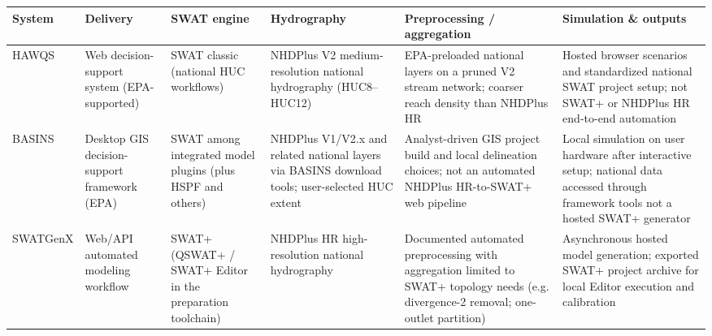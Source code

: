 \begin{tabularx}{\textwidth}{@{} Z Y Y Y Y Y @{}}
\toprule
System & Delivery & SWAT engine & Hydrography & Preprocessing / aggregation & Simulation \& outputs \\
\midrule
HAWQS & Web decision-support system (EPA-supported) & SWAT classic (national HUC workflows) & NHDPlus V2 medium-resolution national hydrography (HUC8--HUC12) & EPA-preloaded national layers on a pruned V2 stream network; coarser reach density than NHDPlus HR & Hosted browser scenarios and standardized national SWAT project setup; not SWAT+ or NHDPlus HR end-to-end automation \\
BASINS & Desktop GIS decision-support framework (EPA) & SWAT among integrated model plugins (plus HSPF and others) & NHDPlus V1/V2.x and related national layers via BASINS download tools; user-selected HUC extent & Analyst-driven GIS project build and local delineation choices; not an automated NHDPlus HR-to-SWAT+ web pipeline & Local simulation on user hardware after interactive setup; national data accessed through framework tools not a hosted SWAT+ generator \\
SWATGenX & Web/API automated modeling workflow & SWAT+ (QSWAT+ / SWAT+ Editor in the preparation toolchain) & NHDPlus HR high-resolution national hydrography & Documented automated preprocessing with aggregation limited to SWAT+ topology needs (e.g. divergence-2 removal; one-outlet partition) & Asynchronous hosted model generation; exported SWAT+ project archive for local Editor execution and calibration \\
\bottomrule
\end{tabularx}
